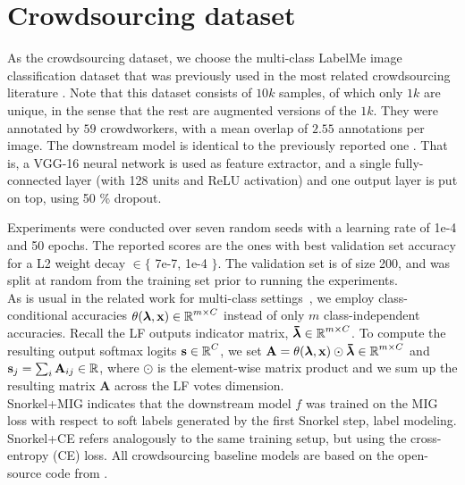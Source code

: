 \documentclass{article}
\newcommand{\features}{\mathbf{x}}
\newcommand{\lambdaOnehot}{\accentset{\rule{.4em}{.8pt}}{\lfs}}
\begin{document}
\section{Crowdsourcing dataset} \label{sec:crowdsourcingAppendix}
As the crowdsourcing dataset, we choose the multi-class LabelMe image classification dataset that was previously used in the most related crowdsourcing literature \cite{rodrigues2018deep, MaxMIG}.
Note that this dataset consists of $10k$ samples, of which only $1k$ are unique, in the sense that the rest are augmented versions of the $1k$. They were annotated by $59$ crowdworkers, with a mean overlap of $2.55$ annotations per image.
The downstream model is identical to the previously reported one \cite{rodrigues2018deep, MaxMIG}. That is, a VGG-16 neural network is used as feature extractor, and a single fully-connected layer (with 128 units and ReLU activation) and
one output layer is put on top, using 50 \% dropout.

Experiments were conducted over seven random seeds with a learning rate of 1e-4 and 50 epochs. The reported scores are the ones with best validation set accuracy for a L2 weight decay $\in \{$ 7e-7, 1e-4 $\}$. The validation set is of size 200, and was split at random from the training set prior to running the experiments.
\\
As is usual in the related work for multi-class settings~\cite{Snorkel}, we employ class-conditional accuracies $\theta(\lfs, \features) \in \R^{m \times C}$ instead of only $m$ class-independent accuracies. Recall the LF outputs indicator matrix,
$\lambdaOnehot \in \R^{m \times C}$. To compute the resulting output softmax logits $\mathbf{s} \in \operatorname{\mathbb{R}}^{C}$, we set $\mathbf{A} = \theta(\lfs, \features) \odot \lambdaOnehot \in \R^{m \times C}$ and $\mathbf{s}_j = \sum_i \mathbf{A}_{ij} \in \operatorname{\mathbb{R}}$, where $\odot$ is the element-wise matrix product and we sum up the resulting matrix $\mathbf{A}$ across the LF votes dimension.
\\
Snorkel+MIG indicates that the downstream model $f$ was trained on the MIG loss with respect to soft labels generated by the first Snorkel step, label modeling. Snorkel+CE refers analogously to the same training setup, but using the cross-entropy (CE) loss.
All crowdsourcing baseline models are based on the open-source code from \cite{MaxMIG}.
\end{document}

